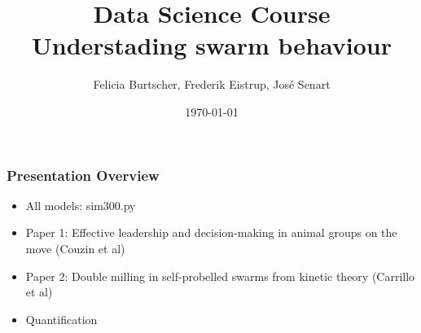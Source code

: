 \documentclass[compress]{beamer}
\title[Short title]{Data Science Course\\
\small{Understading swarm behaviour}}
\author[Grupo B4]{Felicia Burtscher, Frederik Eistrup, Jos\'{e} Senart\\  %
} %
\date{\today}
\institute[FUB]{\vspace{-10pt}Freie Universität Berlin}
\begin{document}
\begin{frame}
\titlepage
\end{frame}



\begin{frame}
  \frametitle{Presentation Overview}

  \begin{itemize}
  	\item All models: sim300.py
	\item Paper 1: Effective leadership and decision-making in animal groups on the move (Couzin et al)
	\item Paper 2: Double milling in self-probelled swarms from kinetic theory (Carrillo et al)
	\item Quantification
  \end{itemize}


\end{frame}
\end{document}
